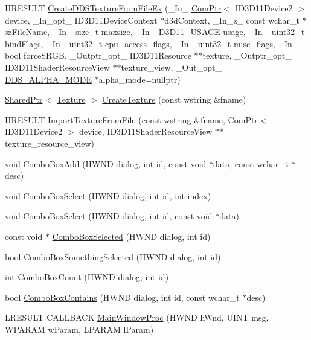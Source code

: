 \begin{DoxyCompactItemize}
\item 
H\+R\+E\+S\+U\+LT \hyperlink{namespacemage_a925c43c7549ca8093611581aeb4e39ae}{Create\+D\+D\+S\+Texture\+From\+File\+Ex} (\+\_\+\+In\+\_\+ \hyperlink{namespacemage_ae74f374780900893caa5555d1031fd79}{Com\+Ptr}$<$ I\+D3\+D11\+Device2 $>$ device, \+\_\+\+In\+\_\+opt\+\_\+ I\+D3\+D11\+Device\+Context $\ast$d3d\+Context, \+\_\+\+In\+\_\+z\+\_\+ const wchar\+\_\+t $\ast$sz\+File\+Name, \+\_\+\+In\+\_\+ size\+\_\+t maxsize, \+\_\+\+In\+\_\+ D3\+D11\+\_\+\+U\+S\+A\+GE usage, \+\_\+\+In\+\_\+ uint32\+\_\+t bind\+Flags, \+\_\+\+In\+\_\+ uint32\+\_\+t cpu\+\_\+access\+\_\+flags, \+\_\+\+In\+\_\+ uint32\+\_\+t misc\+\_\+flags, \+\_\+\+In\+\_\+ bool force\+S\+R\+GB, \+\_\+\+Outptr\+\_\+opt\+\_\+ I\+D3\+D11\+Resource $\ast$$\ast$texture, \+\_\+\+Outptr\+\_\+opt\+\_\+ I\+D3\+D11\+Shader\+Resource\+View $\ast$$\ast$texture\+\_\+view, \+\_\+\+Out\+\_\+opt\+\_\+ \hyperlink{namespacemage_a0c586a2bad862f4858900ca121ca80c2}{D\+D\+S\+\_\+\+A\+L\+P\+H\+A\+\_\+\+M\+O\+DE} $\ast$alpha\+\_\+mode=nullptr)
\item 
\hyperlink{namespacemage_a1e01ae66713838a7a67d30e44c67703e}{Shared\+Ptr}$<$ \hyperlink{classmage_1_1_texture}{Texture} $>$ \hyperlink{namespacemage_ac27913e621bde0fd01312183aafaaca0}{Create\+Texture} (const wstring \&fname)
\item 
H\+R\+E\+S\+U\+LT \hyperlink{namespacemage_ac2619bee8420f2aa99af09cb9f7567b8}{Import\+Texture\+From\+File} (const wstring \&fname, \hyperlink{namespacemage_ae74f374780900893caa5555d1031fd79}{Com\+Ptr}$<$ I\+D3\+D11\+Device2 $>$ device, I\+D3\+D11\+Shader\+Resource\+View $\ast$$\ast$texture\+\_\+resource\+\_\+view)
\item 
void \hyperlink{namespacemage_a78e4a1d3c21d6eb8657bfa0a9631d6ee}{Combo\+Box\+Add} (H\+W\+ND dialog, int id, const void $\ast$data, const wchar\+\_\+t $\ast$desc)
\item 
void \hyperlink{namespacemage_aa510d1e5e45102338fce66ae46b2b267}{Combo\+Box\+Select} (H\+W\+ND dialog, int id, int index)
\item 
void \hyperlink{namespacemage_a026dd5ecb1cea93f38193f403e878d23}{Combo\+Box\+Select} (H\+W\+ND dialog, int id, const void $\ast$data)
\item 
const void $\ast$ \hyperlink{namespacemage_affa0d91f266dfbe4ed4a29c26b04dcb8}{Combo\+Box\+Selected} (H\+W\+ND dialog, int id)
\item 
bool \hyperlink{namespacemage_afa2451527062c4213d21bdf01b1922c6}{Combo\+Box\+Something\+Selected} (H\+W\+ND dialog, int id)
\item 
int \hyperlink{namespacemage_a5c586938d7f59a82c8528fab41f17960}{Combo\+Box\+Count} (H\+W\+ND dialog, int id)
\item 
bool \hyperlink{namespacemage_a98228034fca63017765bcdf5966be239}{Combo\+Box\+Contains} (H\+W\+ND dialog, int id, const wchar\+\_\+t $\ast$desc)
\item 
L\+R\+E\+S\+U\+LT C\+A\+L\+L\+B\+A\+CK \hyperlink{namespacemage_a7ab7652c75189226bf8299647e897c99}{Main\+Window\+Proc} (H\+W\+ND h\+Wnd, U\+I\+NT msg, W\+P\+A\+R\+AM w\+Param, L\+P\+A\+R\+AM l\+Param)
\end{DoxyCompactItemize}
